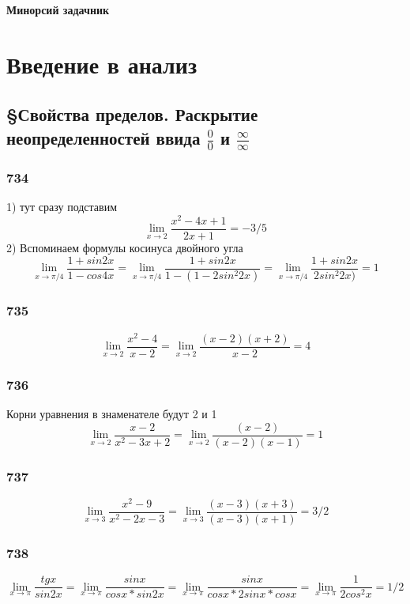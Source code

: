\documentclass[12pt]{article}
\begin{document}
\begin{titlepage}
\begin{center}
\textbf{\huge Минорсий задачник}
\end{center}
\end{titlepage}
\tableofcontents
\newpage
\section{Введение в анализ}
\subsection{\S Свойства пределов. Раскрытие неопределенностей ввида $\frac{0}{0}$ и $\frac{\infty}{\infty}$}
\subsubsection{734}
1) тут сразу подставим
$$
\lim_{x\to 2} \frac{x^2-4x+1}{2x+1}= -3/5
$$
2) Вспоминаем формулы косинуса двойного угла
$$
\lim_{x\to \pi/4} \frac{1+sin2x}{1-cos4x}=
\lim_{x\to \pi/4} \frac{1+sin2x}{1-(1-2sin^{2}2x)}=
\lim_{x\to \pi/4} \frac{1+sin2x}{2sin^{2}2x)}=1
$$

\newpage
\subsubsection{735}
$$
\lim_{x\to 2} \frac{x^2-4}{x-2}=
\lim_{x\to 2} \frac{(x-2)(x+2)}{x-2}=4
$$

\newpage
\subsubsection{736}
Корни уравнения в знаменателе будут 2 и 1
$$
\lim_{x\to 2} \frac{x-2}{x^2-3x+2}=
\lim_{x\to 2} \frac{(x-2)}{(x-2)(x-1)}=1
$$

\newpage
\subsubsection{737}
$$
\lim_{x\to 3} \frac{x^2-9}{x^2-2x-3}=
\lim_{x\to 3} \frac{(x-3)(x+3)}{(x-3)(x+1)}=3/2
$$

\newpage
\subsubsection{738}
$$
\lim_{x\to \pi} \frac{tgx}{sin2x}=
\lim_{x\to \pi} \frac{sinx}{cosx*sin2x}=
\lim_{x\to \pi} \frac{sinx}{cosx*2sinx*cosx}=
\lim_{x\to \pi} \frac{1}{2cos^2 x}=1/2
$$
\end{document}
